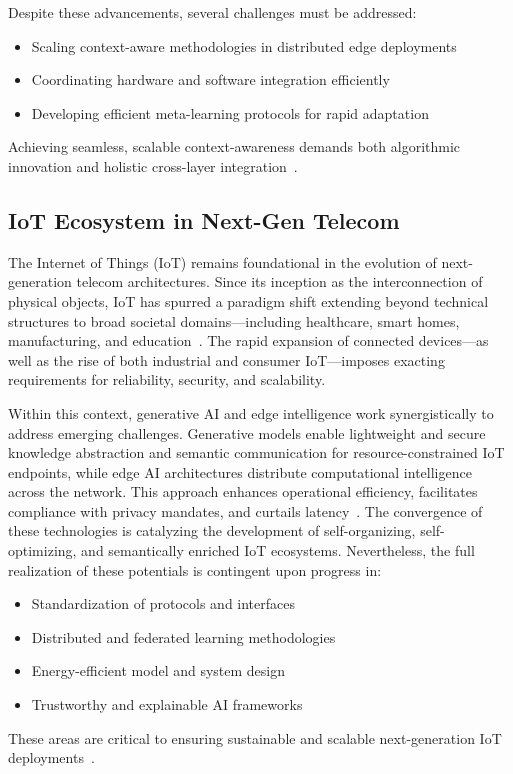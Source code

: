 Despite these advancements, several challenges must be addressed:
\begin{itemize}
    \item Scaling context-aware methodologies in distributed edge deployments
    \item Coordinating hardware and software integration efficiently
    \item Developing efficient meta-learning protocols for rapid adaptation
\end{itemize}
Achieving seamless, scalable context-awareness demands both algorithmic innovation and holistic cross-layer integration~\cite{ref27,ref28,ref39}.

\subsection{IoT Ecosystem in Next-Gen Telecom}

The Internet of Things (IoT) remains foundational in the evolution of next-generation telecom architectures. Since its inception as the interconnection of physical objects, IoT has spurred a paradigm shift extending beyond technical structures to broad societal domains—including healthcare, smart homes, manufacturing, and education~\cite{ref45}. The rapid expansion of connected devices—as well as the rise of both industrial and consumer IoT—imposes exacting requirements for reliability, security, and scalability.

Within this context, generative AI and edge intelligence work synergistically to address emerging challenges. Generative models enable lightweight and secure knowledge abstraction and semantic communication for resource-constrained IoT endpoints, while edge AI architectures distribute computational intelligence across the network. This approach enhances operational efficiency, facilitates compliance with privacy mandates, and curtails latency~\cite{ref44,ref45,ref49}. The convergence of these technologies is catalyzing the development of self-organizing, self-optimizing, and semantically enriched IoT ecosystems. Nevertheless, the full realization of these potentials is contingent upon progress in:
\begin{itemize}
    \item Standardization of protocols and interfaces
    \item Distributed and federated learning methodologies
    \item Energy-efficient model and system design
    \item Trustworthy and explainable AI frameworks
\end{itemize}
These areas are critical to ensuring sustainable and scalable next-generation IoT deployments~\cite{ref44,ref45}.

